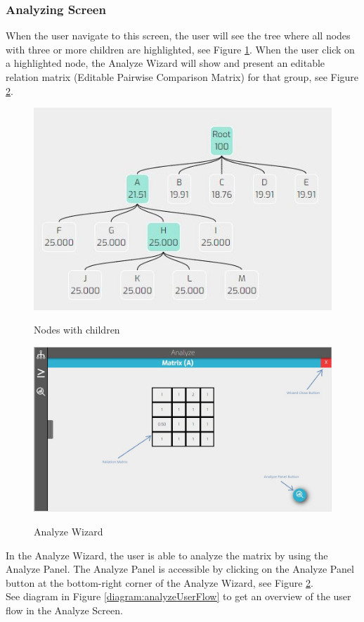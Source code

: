\documentclass[11pt]{article} %
\begin{document}
\newpage
\subsubsection{Analyzing Screen}
When the user navigate to this screen, the user will see the tree where all nodes with three or more children are highlighted, see Figure \ref{screenshot:analyze Highlight}. When the user click on a highlighted node, the Analyze Wizard will show and present an editable relation matrix (Editable Pairwise Comparison Matrix) for that group, see Figure \ref{screenshot:analyze wizard}.\\[24pt]



\begin{figure}[h!]
  \caption{Nodes with children}
  \centering
  \includegraphics[width=\textwidth]{analyzeScreenHighlights}
  \label{screenshot:analyze Highlight}
\end{figure}

\begin{figure}
  \caption{Analyze Wizard}
  \centering
  \includegraphics[width=\textwidth]{analyzeWizard}
  \label{screenshot:analyze wizard}
\end{figure}
\noindent
In the Analyze Wizard, the user is able to analyze the matrix by using the Analyze Panel. The Analyze Panel is accessible by clicking on the Analyze Panel button at the bottom-right corner of the Analyze Wizard, see Figure \ref{screenshot:analyze wizard}.\\
See diagram in Figure \ref{diagram:analyzeUserFlow} to get an overview of the user flow in the Analyze Screen.
\end{document}
